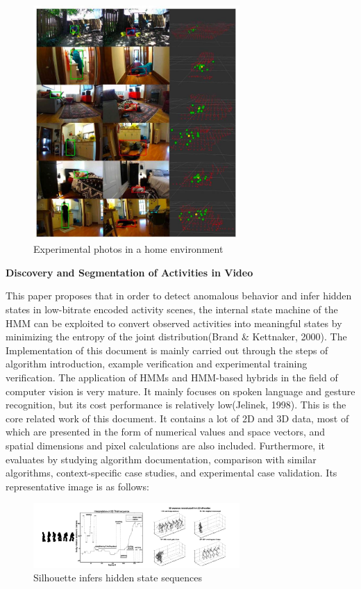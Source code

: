 \documentclass[12pt]{article}
\begin{document}
\begin{figure}[H]
\centering
\includegraphics[width=0.7\textwidth]{Paper4.pic.jpg}
\caption{Experimental photos in a home environment} 
\end{figure}

\noindent \textbf{Discovery and Segmentation of Activities in Video}

\noindent This paper proposes that in order to detect anomalous behavior and infer hidden states in low-bitrate encoded activity scenes, the internal state machine of the HMM can be exploited to convert observed activities into meaningful states by minimizing the entropy of the joint distribution(Brand \& Kettnaker, 2000). The Implementation of this document is mainly carried out through the steps of algorithm introduction, example verification and experimental training verification. The application of HMMs and HMM-based hybrids in the field of computer vision is very mature. It mainly focuses on spoken language and gesture recognition, but its cost performance is relatively low(Jelinek, 1998). This is the core related work of this document. It contains a lot of 2D and 3D data, most of which are presented in the form of numerical values and space vectors, and spatial dimensions and pixel calculations are also included. Furthermore, it evaluates by studying algorithm documentation, comparison with similar algorithms, context-specific case studies, and experimental case validation. Its representative image is as follows:

\begin{figure}[H]
\centering
\includegraphics[width=0.7\textwidth]{Paper5.pic.jpg}
\caption{Silhouette infers hidden state sequences} 
\end{figure}
\end{document}
